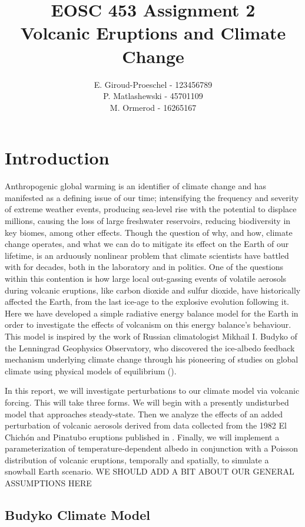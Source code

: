 \documentclass[12pt]{article}
\title{EOSC 453 Assignment 2\\
\large Volcanic Eruptions and Climate Change}
\author{
    E. Giroud-Proeschel - 123456789 \\
    P. Matlashewski - 45701109\\
    M. Ormerod - 16265167
}
\begin{document}
\maketitle
\newpage
\tableofcontents
\newpage

\section{Introduction}
Anthropogenic global warming is an identifier of climate change and has
manifested as a defining issue of our time; intensifying the frequency and
severity of extreme weather events, producing sea-level rise with the potential
to displace millions, causing the loss of large freshwater reservoirs, reducing
biodiversity in key biomes, among other effects. Though the question of why, and
how, climate change operates, and what we can do to mitigate its effect on the
Earth of our lifetime, is an arduously nonlinear problem that climate scientists
have battled with for decades, both in the laboratory and in politics. One of
the questions within this contention is how large local out-gassing events of
volatile aerosols during volcanic eruptions, like carbon dioxide and sulfur
dioxide, have historically affected the Earth, from the last ice-age to the
explosive evolution following it. Here we have developed a simple radiative
energy balance model for the Earth in order to investigate the effects of
volcanism on this energy balance's behaviour. This model is inspired by the
work of Russian climatologist Mikhail I. Budyko of the Lenningrad Geophysics
Observatory, who discovered the ice-albedo feedback mechanism underlying climate
change through his pioneering of studies on global climate using physical models
of equilibrium (\cite{budyko_albedo}).

In this report, we will investigate perturbations to our climate model via
volcanic forcing. This will take three forms. We will begin with a presently
undisturbed model that approaches steady-state. Then we analyze the effects of
an added perturbation of volcanic aerosols derived from data collected from the
1982 El Chichón and Pinatubo eruptions published in \cite{robock}. Finally, we
will implement a parameterization of temperature-dependent albedo in conjunction
with a Poisson distribution of volcanic eruptions, temporally and spatially, to
simulate a snowball Earth scenario.
WE SHOULD ADD A BIT ABOUT OUR GENERAL ASSUMPTIONS HERE

\subsection{Budyko Climate Model}
\end{document}
